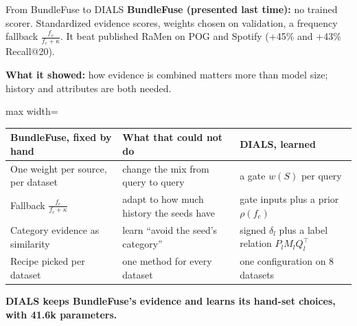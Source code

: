 \documentclass[10pt,aspectratio=169]{beamer}
\newcommand{\key}[1]{\textcolor{Accent}{\textbf{#1}}}
\begin{document}
\begin{frame}{From BundleFuse to DIALS}
\small
\key{BundleFuse (presented last time):} no trained scorer. Standardized evidence scores, weights chosen on validation, a frequency fallback $\frac{f_c}{f_c+\kappa}$. It beat published RaMen on POG and Spotify (+45\% and +43\% Recall@20).\par
\vspace{1.5mm}
\key{What it showed:} how evidence is combined matters more than model size; history and attributes are both needed.\par
\vspace{1.5mm}
\renewcommand{\arraystretch}{1.1}
\begin{adjustbox}{max width=\textwidth}\begin{tabular}{@{}>{\raggedright\arraybackslash}p{}>{\raggedright\arraybackslash}p{}>{\raggedright\arraybackslash}p{}@{}}
\toprule
\textbf{BundleFuse, fixed by hand} & \textbf{What that could not do} & \textbf{DIALS, learned}\\\midrule
One weight per source, per dataset & change the mix from query to query & a gate $w(S)$ per query\\
Fallback $\frac{f_c}{f_c+\kappa}$ & adapt to how much history the seeds have & gate inputs plus a prior $\rho(f_c)$\\
Category evidence as similarity & learn ``avoid the seed's category'' & signed $\delta_l$ plus a label relation $P_lM_lQ_l^\top$\\
Recipe picked per dataset & one method for every dataset & one configuration on 8 datasets\\\bottomrule
\end{tabular}\end{adjustbox}\par
\vspace{1.5mm}
\key{DIALS keeps BundleFuse's evidence and learns its hand-set choices, with 41.6k parameters.}
\end{frame}
\end{document}
